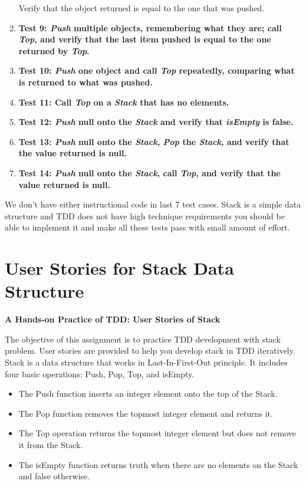 \begin{enumerate}
Verify that the object returned is equal to the one that was pushed.

\item {\textbf{Test 9: {\em Push} multiple objects, remembering what they are; call {\em Top}, and verify that the last item pushed is equal to the one returned by {\em Top}.}}
\item {\textbf{Test 10: {\em Push} one object and call {\em Top} repeatedly, comparing what is returned to what was pushed.}}
\item {\textbf{Test 11: Call {\em Top} on a {\em Stack} that has no elements.}}
\item {\textbf{Test 12: {\em Push} null onto the {\em Stack} and verify that {\em isEmpty} is false.}}
\item {\textbf{Test 13: {\em Push} null onto the {\em Stack}, {\em Pop} the {\em Stack}, and verify that the value returned is null.}}
\item {\textbf{Test 14: {\em Push} null onto the {\em Stack}, call {\em Top}, and verify that the value returned is null.}}

\end{enumerate}

We don't have either instructional code in last 7 test cases. Stack
is a simple data structure and TDD does not have high technique
requirements you should be able to implement it and make all these
tests pass with small amount of effort.

\chapter{User Stories for Stack Data Structure}
\label{app:UserStoriesStack}

\clearpage
\begin{center}
\LARGE{\textbf{A Hands-on Practice of TDD: User Stories of Stack}}
\end{center}

\noindent The objective of this assignment is to practice TDD development with stack problem. User stories are provided to help you develop stack in TDD iteratively. Stack is a data structure that works in Last-In-First-Out principle. It includes four basic operations: Push, Pop, Top, and isEmpty. 
\begin{itemize}
\item The Push function inserts an integer element onto the top of the Stack.
\item The Pop function removes the topmost integer element and returns it.
\item The Top operation returns the topmost integer element but does not remove it from the Stack.
\item The isEmpty function returns truth when there are no elements on the Stack and false otherwise.
\end{itemize}

